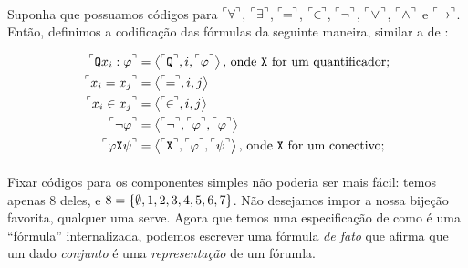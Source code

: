         \paragraph{}
            Suponha que possuamos códigos para $\FMLA{\forall}$, $\FMLA{\exists}$, $\FMLA{\!\!=\!\!}$, $\FMLA{\!\!\in\!\!}$, 
            $\FMLA{\neg}$, $\FMLA{\!\lor\!}$, $\FMLA{\!\land\!}$ e $\FMLA{\!\!\rar\!\!}$.
            Então, definimos a codificação das fórmulas da seguinte maneira, similar a de \cite{Drake}:

        \begin{align*}
            \FMLA{\texttt{Q} x_i:\varphi} &= \TUPLE{\FMLA{\texttt{Q}}}{i}{\FMLA{\varphi}}           \text{, onde \texttt{X} for um quantificador;}  \\
            \FMLA{x_i  = x_j}             &= \TUPLE{\FMLA{\!\!=\!\!}}{i}{j}                                                                         \\
            \FMLA{x_i\in x_j}             &= \TUPLE{\FMLA{\!\!\in\!\!}}{i}{j}                                                                       \\
            \FMLA{\neg\varphi}            &= \TUPLE{\FMLA{\neg}}{\FMLA{\varphi}}{\FMLA{\varphi}}                                                    \\
            \FMLA{\varphi\texttt{X}\psi}  &= \TUPLE{\FMLA{\texttt{X}}}{\FMLA{\varphi}}{\FMLA{\psi}} \text{, onde \texttt{X} for um conectivo;}      
        \end{align*}

        \paragraph{}
            Fixar códigos para os componentes simples não poderia ser mais fácil: temos apenas 8 deles, e $8 = \SET{\emptyset}{1}{2}{3}{4}{5}{6}{7}$.
            Não desejamos impor a nossa bijeção favorita, qualquer uma serve. Agora que temos uma especificação de como é uma ``fórmula'' internalizada, 
            podemos escrever uma fórmula \textit{de fato} que afirma que um dado \textit{conjunto} é uma \textit{representação} de um fórumla.
            
